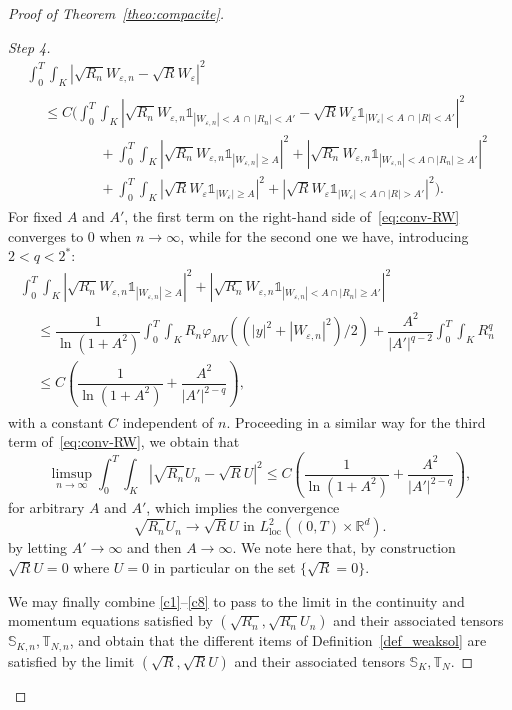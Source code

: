 \documentclass[10pt]{amsart}
\theoremstyle{definition}\newtheorem{defi}[theo]{Definition}\newtheorem{rema}[theo]{Remark}\newtheorem{exam}[theo]{Example}\newtheorem{exem}[theo]{Example}\newtheorem{nota}[theo]{Notation}
\newcommand*{\un}{\mathds{1}}
\newcommand*{\loc}{\mathrm{loc}}
\newcommand*\<{\left\langle}
\renewcommand*\>{\right\rangle}
\renewcommand*\le{\leqslant}
\renewcommand*\ge{\geqslant}
\newcommand*\eps{\varepsilon}
\begin{document}
\begin{proof}[Proof of Theorem~\ref{theo:compacite}]
\begin{proof}[Step 4]
\begin{multline}
\int_{0}^T \int_K \left|\sqrt{R_n} W_{\eps,n} - \sqrt{R} W_{\eps} \right|^2 \\
\begin{aligned}
& \le C \Bigg (
\int_{0}^T \int_K \left|\sqrt{R_n} W_{\eps,n} \un_{|W_{\eps,n}| < A \, \cap \, |R_n| < A'} - \sqrt{R} W_{\eps} \un_{|W_{\eps}| < A \, \cap \, |R| < A'} \right|^2 \\
&\qquad \qquad + \int_{0}^T \int_K \left|\sqrt{R_n} W_{\eps,n} \un_{|W_{\eps,n}| \ge A}\right|^2 + \left|\sqrt{R_n} W_{\eps,n} \un_{|W_{\eps,n}| < A \cap |R_n |\ge A' }\right|^2 \\
&\qquad\qquad + \int_{0}^T \int_K \left|\sqrt{R} W_{\eps} \un_{|W_{\eps}| \ge A}\right|^2 + \left|\sqrt{R} W_{\eps} \un_{|W_{\eps}| < A \cap |R| > A' }\right|^2
\Bigg).
\end{aligned}
\end{multline}
For fixed $A$ and $A'$, the first term on the right-hand side of~\eqref{eq:conv-RW} converges to $0$ when $n\to \infty$, while for the second one we have, introducing $2 < q < 2^{*}$:
\begin{multline*}
\int_{0}^T \int_K \left|\sqrt{R_n} W_{\varepsilon,n} \un_{|W_{\varepsilon,n}| \ge A}\right|^2 + \left|\sqrt{R_n} W_{\varepsilon,n} \un_{|W_{\varepsilon,n}| < A \cap |R_n| \ge A' }\right|^2\\
\begin{aligned}
&\le \dfrac{1}{\ln(1+A^2)} \int_{0}^T \int_K R_n \varphi_{MV}((|y|^2 + |W_{\varepsilon,n}|^2)/2) + \dfrac{A^2}{|A'|^{q-2}}\int_{0}^T \int_K R_n^{q} \\
&\le C \left(\dfrac{1}{\ln(1+A^2)} + \dfrac{A^2}{|A'|^{2-q}} \right),
\end{aligned}
\end{multline*}
with a constant $C$ independent of $n.$ Proceeding in a similar way for the third term of~\eqref{eq:conv-RW}, we obtain that
\[
\limsup_{n \to \infty} \int_{0}^T \int_K \left|\sqrt{R_n} U_n - \sqrt{R} U \right|^2
\le C \left(\dfrac{1}{\ln(1+A^2)} + \dfrac{A^2}{|A'|^{2-q}} \right),
\]
for arbitrary $A$ and $A'$, which implies the convergence
\begin{equation}\label{c8}
\tag{c8}
\sqrt{R_n} U_n \to \sqrt{R}U \text{ in $L^2_{\loc}((0,T) \times \mathbb R^d)$}.
\end{equation}
by letting $A' \to \infty$ and then $A \to \infty.$ We note here that, by construction $\sqrt{R} U = 0$ where $U =0$ in particular on the set $\{\sqrt{R}=0\}.$

We may finally combine \eqref{c1}--\eqref{c8} to pass to the limit in the continuity and momentum equations satisfied by $(\sqrt{R_n},\sqrt{R_n}U_n)$ and their associated tensors $\mathbb S_{K,n}, \mathbb T_{N,n}$, and obtain that the different items of Definition~\ref{def_weaksol} are satisfied by the limit $(\sqrt{R},\sqrt{R}U)$ and their associated tensors $\mathbb S_{K}, \mathbb T_{N}$.
\end{proof}
\let\qed\relax
\end{proof}
\end{document}
